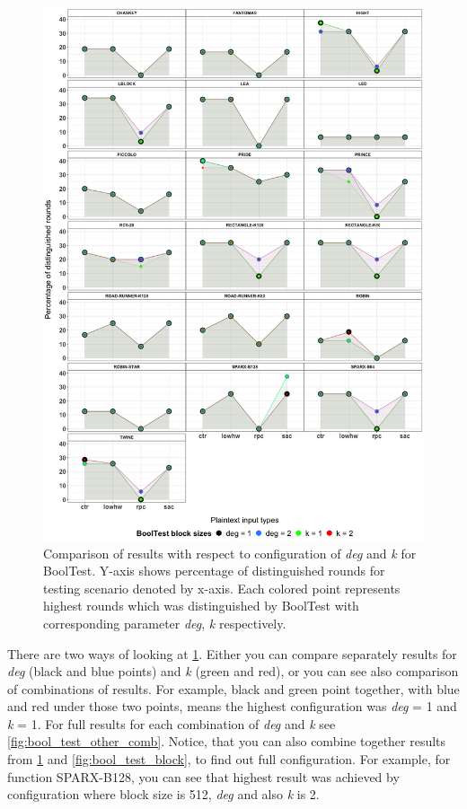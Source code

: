 \documentclass[
    digital,    %
    oneside,    %
    color,
    11pt,
    nocover,
    notable,
    nolof,
    nolot,
    final
]{fithesis3}
\renewcommand\_{\textunderscore\allowbreak}
\begin{document}
\begin{figure}[htp]
	\centering
	\includegraphics[width=\textwidth]{./images/pictures/bool_test_other_comparison.png}
	\caption{Comparison of results with respect to configuration of \textit{deg} and \textit{k} for BoolTest. Y-axis shows percentage of distinguished rounds for testing scenario denoted by x-axis. Each colored point represents highest rounds which was distinguished by BoolTest with corresponding parameter \textit{deg}, \textit{k} respectively.}
	\label{fig:bool_test_other}
\end{figure}

There are two ways of looking at \cref{fig:bool_test_other}. Either you can compare separately results for \textit{deg} (black and blue points) and \textit{k} (green and red), or you can see also comparison of combinations of results. For example, black and green point together, with blue and red under those two points, means the highest configuration was \textit{deg} = 1 and \textit{k} = 1. For full results for each combination of \textit{deg} and \textit{k} see \cref{fig:bool_test_other_comb}. Notice, that you can also combine together results from \cref{fig:bool_test_other} and \cref{fig:bool_test_block}, to find out full configuration. For example, for function SPARX-B128, you can see that highest result was achieved by configuration where block size is 512, \textit{deg} and also \textit{k} is 2.
\end{document}
